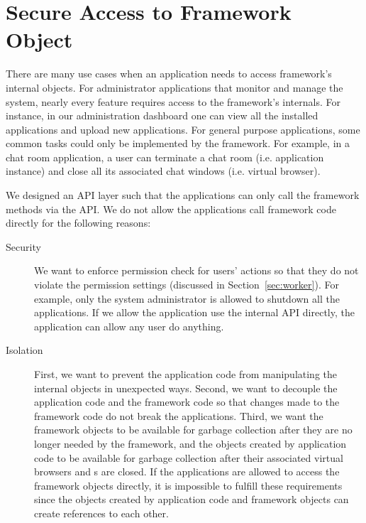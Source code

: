 \section{Secure Access to Framework Object}
\label{sec:api}

There are many use cases when an application needs to access framework's
internal objects. For administrator applications that monitor and manage the
system, nearly every feature requires access to the framework's internals. For
instance, in our administration dashboard one can view all the installed
applications and upload new applications. For general purpose applications,
some common tasks could only be implemented by the framework. For example, in
a chat room application, a user can terminate a chat room (i.e. application
instance) and close all its associated chat windows (i.e. virtual browser).

We designed an API layer such that the applications can only call the
framework methods via the API. We do not allow the applications call framework
code directly for the following reasons:

\begin{description}

\item[Security]  We want to enforce permission check for users' actions so that
they do not violate the permission settings (discussed in
Section~\ref{sec:worker}). For example, only the system administrator is
allowed to shutdown all the  applications. 
If we allow the application use the internal API directly,
the application can allow any user do anything.


\item[Isolation]  First, we want to prevent the application code from
manipulating the internal objects in unexpected ways. Second, we want to
decouple the application code and the framework code so  that changes made to
the framework code do not break the applications.   Third,   we want the
framework objects to be available for garbage collection after they are no
longer needed by the framework,  and the objects created by application code
to be available for garbage collection after their associated virtual browsers
and \appins{}s are closed.  If the applications are allowed to access the
framework objects directly,   it is impossible to fulfill these requirements
since the objects created by application code and framework objects can create
references to each other.

\end{description}


